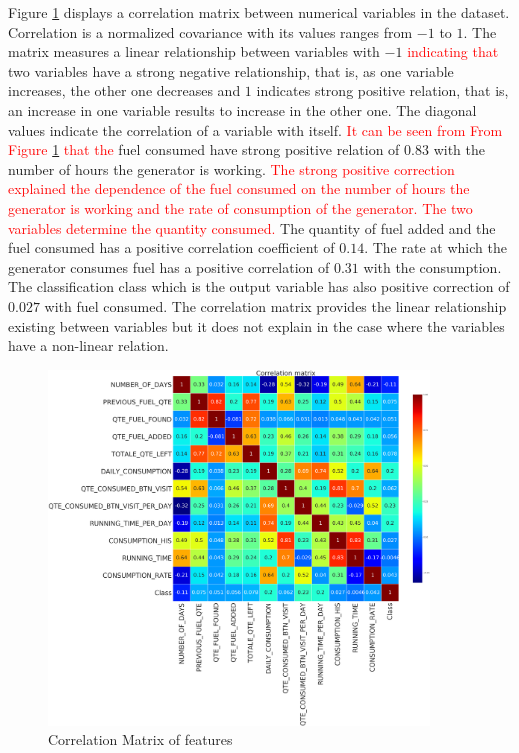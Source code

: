 \documentclass[a4paper,fleqn]{cas-dc}
\newcommand\mycorrections[1]{\textcolor{red}{#1}}
\begin{document}
Figure \ref{fig:correlation matrix} displays a correlation matrix between numerical variables in the dataset. 
Correlation is a normalized covariance with its values ranges from $-1$ to $1$. The matrix measures a linear relationship between variables with $-1$ \mycorrections{indicating that} two variables have a strong negative relationship, that is, as one variable increases, the other one decreases and $1$ indicates strong positive relation, that is, an increase in one variable results to increase in the other one. The diagonal values indicate the correlation of a variable with itself. \mycorrections{ It can be seen from From Figure \ref{fig:correlation matrix} that the} fuel consumed have strong positive relation of $0.83$ with the number of hours the generator is working. \mycorrections{ The strong positive correction explained the dependence of the fuel consumed on the number of hours the generator is working and the rate of consumption of the generator. The two variables determine the quantity consumed. }
The quantity of fuel added and the fuel consumed has a positive correlation coefficient of $0.14$. The rate at which the generator consumes fuel has a positive correlation of $0.31$ with the consumption. The classification class which is the output variable has also positive correction of $0.027$  with fuel consumed. The correlation matrix provides the linear relationship existing between variables but it does not explain in the case where the variables have a non-linear relation.

\begin{figure}
	\begin{minipage}[H]{\linewidth}
	\centering
	\includegraphics[width=0.9\textwidth]{Figures/correlation_matrix} %
\end{minipage}
	\caption{Correlation Matrix of features}
	\label{fig:correlation matrix}
\end{figure}
\end{document}
